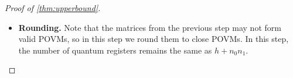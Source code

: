 \documentclass[11pt]{article}
\def\H{\CMcal{H}}
\theoremstyle{plain}
\theoremstyle{definition}
\newcommand {\minusspace} {\: \! \!}
\newcommand {\Fn} [2] {\ensuremath{ #1 \minusspace \Br{ #2 } }}
\newcommand {\set} [1] {\ensuremath{ \left\lbrace #1 \right\rbrace }}
\newcommand {\br} [1] {\ensuremath{ \left( #1 \right) }}
\newcommand {\Br} [1] {\ensuremath{ \left[ #1 \right] }}
\newcommand {\ab} [1] {\ensuremath{ \left| #1 \right| }}
\DeclareMathOperator*{\bigE}{\mathbb{E}}
\newcommand {\expec} [2] {\Fn{\bigE_{\substack{#1}}}{#2}}
\newcommand{\nnorm}[1]{{\left\vert\kern-0.25ex\left\vert\kern-0.25ex\left\vert #1
		\right\vert\kern-0.25ex\right\vert\kern-0.25ex\right\vert}}
\newcommand {\Tr} {\ensuremath{ \mathrm{Tr} }}
\newcommand {\id} {\ensuremath{\mathds{1}}}
\newcommand{\randx}{\ensuremath{\mathbf{x}}}
\newcommand{\randy}{\ensuremath{\mathbf{y}}}
\newcommand{\herspace}[1]{\ensuremath{\H_m^{\otimes #1}}}
\newcommand{\gval}[3]{\ensuremath{\mathrm{val}_{#1}\br{\set{#2},\set{#3}}}}
\newcommand{\fourtuples}{\ensuremath{\br{x,y,a,b}\in\calX\times\calY\times\calA\times\calB}}
\newcommand{\Pnn}[1] {\ensuremath{{P^{\,x, (#1)}_a}}}
\newcommand{\Qnn}[1] {\ensuremath{{Q^{\,y, (#1)}_b}}}
\newcommand{\calX}{\mathcal{X}}
\newcommand{\calY}{\mathcal{Y}}
\newcommand{\calA}{\mathcal{A}}
\newcommand{\calB}{\mathcal{B}}
\newcommand{\1}{\mathbb{1}} %
\begin{document}
\begin{proof}[Proof of \cref{thm:upperbound}]
\begin{itemize}
For any \fourtuples, applying \cite[Lemma 10.11]{qin2021nonlocal} to $\Pnn{5}(\randx)$, $\Qnn{5}(\randy)$ with $n\gets n_0n_1$, $h\gets h$, $d\gets 2d$, $\tau\gets\tau$ to get $\Pnn{6},\Qnn{6}\in\herspace{h+n_0n_1}$ satisfying the following.
      
   \begin{enumerate}
		\item For any $x,y,a,b$, $\displaystyle\nnorm{\Pnn{6}}_2^2\leq2$ and 		
		$\displaystyle\nnorm{\Qnn{6}}_2^2\leq2.$
		\item $\gval{h+n_0n_1}{\Pnn{6}}{\Qnn{6}}=\expec{\randx,\randy}{\gval{h}{\Pnn{5}(\randx)}{\Qnn{5}(\randy)}}.$
		\item $\displaystyle\sum_{x,a}\mu_A(x)\ab{\frac{1}{m^{h+n_0n_1}}\Tr~\zeta\br{\Pnn{6}}-\frac{1}{m^h}\expec{}{\Tr~\zeta\br{\Pnn{5}(\randx)}}}\leq O\br{t\br{9^dm^{d}\sqrt{\tau}d}^{2/3}}$ and

$\displaystyle\sum_{y,b}\mu_B(y)\ab{\frac{1}{m^{h+n_0n_1}}\Tr~\zeta\br{\Qnn{6}}-\frac{1}{m^h}\expec{}{\Tr~\zeta\br{{\Qnn{5}(\randy)}}}}\leq O\br{t\br{9^dm^{d}\sqrt{\tau}d}^{2/3}}$.
\item For any $x,y$, $\sum_{a\in\calA}\Pnn{6}=\sum_{b\in\calB}\Qnn{6}=\id.$
	\end{enumerate}

\item \textbf{Rounding.} Note that the matrices from the previous step may not form valid POVMs, so in this step we round them to close POVMs. In this step, the number of quantum registers remains the same as $h+n_0n_1$.


\end{itemize}
\end{proof}
\end{document}
